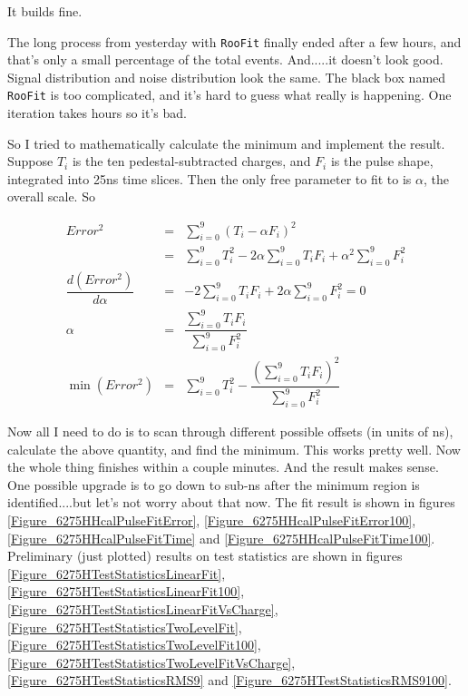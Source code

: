 It builds fine.


The long process from yesterday with \texttt{RooFit} finally ended after a few hours, and that's only a small percentage of the total events.
And.....it doesn't look good.  Signal distribution and noise distribution look the same.  The black box named \texttt{RooFit} is too complicated,
and it's hard to guess what really is happening.  One iteration takes hours so it's bad.

So I tried to mathematically calculate the minimum and implement the result.  Suppose $T_i$ is the ten pedestal-subtracted charges, and
$F_i$ is the pulse shape, integrated into 25ns time slices.  Then the only free parameter to fit to is $\alpha$, the overall scale.  So

\begin{eqnarray}
Error^2 &=& \sum_{i=0}^{9} (T_i - \alpha F_i)^2\nonumber\\
   &=& \sum_{i=0}^{9} T_i^2 - 2 \alpha \sum_{i=0}^{9} T_i F_i + \alpha^2 \sum_{i=0}^{9} F_i^2\nonumber\\
\dfrac{d(Error^2)}{d\alpha} &=& -2\sum_{i=0}^{9} T_i F_i + 2\alpha \sum_{i=0}^{9} F_i^2 = 0\nonumber\\
\alpha &=& \dfrac{\displaystyle\sum_{i=0}^{9} T_i F_i}{\displaystyle\sum_{i=0}^{9} F_i^2}\nonumber\\
\min (Error^2) &=& \sum_{i=0}^{9} T_i^2 - \dfrac{\left(\displaystyle\sum_{i=0}^{9} T_i F_i\right)^2}{\displaystyle\sum_{i=0}^{9} F_i^2}\nonumber
\end{eqnarray}

Now all I need to do is to scan through different possible offsets (in units of ns), calculate the above quantity, and find the minimum.
This works pretty well.  Now the whole thing finishes within a couple minutes.  And the result makes sense.
One possible upgrade is to go down to sub-ns after the minimum region is identified....but let's not worry about that now.
The fit result is shown in figures \ref{Figure_6275HHcalPulseFitError}, \ref{Figure_6275HHcalPulseFitError100},
\ref{Figure_6275HHcalPulseFitTime} and \ref{Figure_6275HHcalPulseFitTime100}.
Preliminary (just plotted) results on test statistics are shown in figures
\ref{Figure_6275HTestStatisticsLinearFit}, \ref{Figure_6275HTestStatisticsLinearFit100}, \ref{Figure_6275HTestStatisticsLinearFitVsCharge},
\ref{Figure_6275HTestStatisticsTwoLevelFit}, \ref{Figure_6275HTestStatisticsTwoLevelFit100}, \ref{Figure_6275HTestStatisticsTwoLevelFitVsCharge},
\ref{Figure_6275HTestStatisticsRMS9} and \ref{Figure_6275HTestStatisticsRMS9100}.

